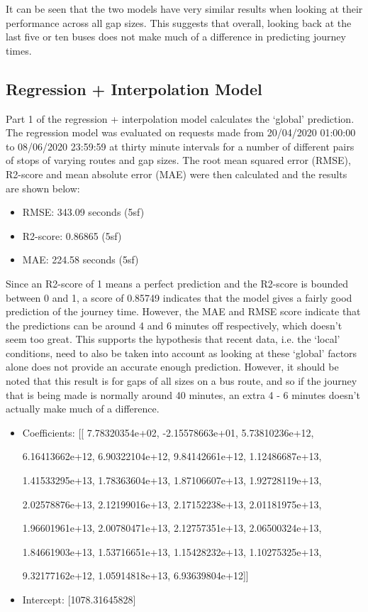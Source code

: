 It can be seen that the two models have very similar results when looking at their performance across all gap sizes. This suggests that overall, looking back at the last five or ten buses does not make much of a difference in predicting journey times. 

\subsection{Regression + Interpolation Model}

Part 1 of the regression + interpolation model calculates the `global' prediction. The regression model was evaluated on requests made from 20/04/2020 01:00:00 to 08/06/2020 23:59:59 at thirty minute intervals for a number of different pairs of stops of varying routes and gap sizes. The root mean squared error (RMSE), R2-score and mean absolute error (MAE) were then calculated and the results are shown below:

\begin{itemize}
    \item RMSE: 343.09 seconds (5sf)
    \item R2-score: 0.86865 (5sf)
    \item MAE: 224.58 seconds (5sf)
\end{itemize}

Since an R2-score of 1 means a perfect prediction and the R2-score is bounded between 0 and 1, a score of 0.85749 indicates that the model gives a fairly good prediction of the journey time. However, the MAE and RMSE score indicate that the predictions can be around 4 and 6 minutes off respectively, which doesn't seem too great. This supports the hypothesis that recent data, i.e. the `local' conditions, need to also be taken into account as looking at these `global' factors alone does not provide an accurate enough prediction. However, it should be noted that this result is for gaps of all sizes on a bus route, and so if the journey that is being made is normally around 40 minutes, an extra 4 - 6 minutes doesn't actually make much of a difference. 

\begin{itemize}
    \item Coefficients: [[ 7.78320354e+02, -2.15578663e+01, 5.73810236e+12, 
    
    6.16413662e+12, 6.90322104e+12, 9.84142661e+12, 1.12486687e+13, 
    
    1.41533295e+13, 1.78363604e+13, 1.87106607e+13, 1.92728119e+13, 
    
    2.02578876e+13, 2.12199016e+13, 2.17152238e+13, 2.01181975e+13, 
    
    1.96601961e+13, 2.00780471e+13, 2.12757351e+13, 2.06500324e+13, 
    
    1.84661903e+13, 1.53716651e+13, 1.15428232e+13, 1.10275325e+13, 
    
    9.32177162e+12, 1.05914818e+13, 6.93639804e+12]]
   \item Intercept: [1078.31645828]
\end{itemize}

